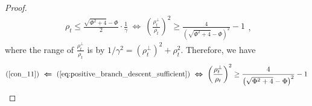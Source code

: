 \documentclass[pdflatex,sn-basic]{sn-jnl}%
\theoremstyle{thmstyleone}%
\begin{document}
\begin{appendices}
\begin{proof}
  \begin{equation*}
  \begin{aligned}
    \rho_{t} 
    \le 
    \frac{\sqrt{ \Phi^2 + 4} - \Phi}{2}
    \cdot \frac{1}{\gamma}
    \ \boldsymbol{\Leftrightarrow} \ 
    \left(
      \frac{\rho_t^{\perp}}{\rho_t}
    \right)^2
    \ge 
    \frac{4}{\left(\sqrt{ \Phi^2 + 4} - \Phi\right)^2} - 1
  \end{aligned},
  \end{equation*}
  where the range of $\frac{\rho_t^{\perp}}{\rho_t}$ is by $1/\gamma^2 = \left(\rho_t^{\perp}\right)^2 + \rho_t^2$.
  Therefore, we have
  \begin{equation*}
  \begin{aligned}
    (\ref{con_11}) 
    \ \boldsymbol{\Leftarrow} \
    (\ref{eq:positive_branch_descent_sufficient}) 
    \ \boldsymbol{\Leftrightarrow} \
    \left(
      \frac{\rho_t^{\perp}}{\rho_t}
    \right)^2
    \ge 
    \frac{4}{\left(\sqrt{ \Phi^2 + 4} - \Phi\right)^2} - 1
  \end{aligned}
  \end{equation*}


\end{proof}
\end{appendices}
\end{document}
